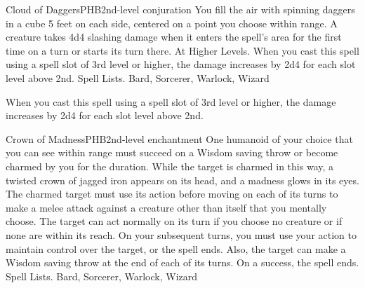 \begin{spell}{Cloud of Daggers}{PHB}{2nd-level conjuration}
{
}
You fill the air with spinning daggers in a cube 5 feet on each side, centered on a point you choose within range. A creature takes 4d4 slashing damage when it enters the spell’s area for the first time on a turn or starts its turn there.
At Higher Levels. When you cast this spell using a spell slot of 3rd level or higher, the damage increases by 2d4 for each slot level above 2nd.
Spell Lists. Bard, Sorcerer, Warlock, Wizard

 When you cast this spell using a spell slot of 3rd level or higher, the damage increases by 2d4 for each slot level above 2nd.
\end{spell}

\begin{spell}{Crown of Madness}{PHB}{2nd-level enchantment}
{
}
One humanoid of your choice that you can see within range must succeed on a Wisdom saving throw or become charmed by you for the duration. While the target is charmed in this way, a twisted crown of jagged iron appears on its head, and a madness glows in its eyes.
The charmed target must use its action before moving on each of its turns to make a melee attack against a creature other than itself that you mentally choose. The target can act normally on its turn if you choose no creature or if none are within its reach.
On your subsequent turns, you must use your action to maintain control over the target, or the spell ends. Also, the target can make a Wisdom saving throw at the end of each of its turns. On a success, the spell ends.
Spell Lists. Bard, Sorcerer, Warlock, Wizard
\end{spell}

